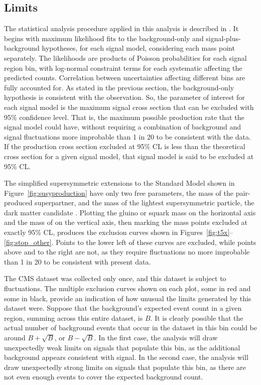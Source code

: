   \subsection{Limits} \label{sec:MT2limits}

  The \CL statistical analysis procedure applied in this analysis is described in \cite{CLS_method}.
  It begins with maximum likelihood fits to the background-only and signal-plus-background hypotheses, for each signal model, considering each mass point separately. 
  The likelihoods are products of Poisson probabilities for each signal region bin, with log-normal constraint terms for each systematic affecting the predicted counts.
  Correlation between uncertainties affecting different bins are fully accounted for.
  As stated in the previous section, the background-only hypothesis is consistent with the observation.
  So, the parameter of interest for each signal model is the maximum signal cross section that can be excluded with 95\% confidence level.
  That is, the maximum possible production rate that the signal model could have, without requiring a combination of background and signal fluctuations more improbable than 1 in 20 to be consistent with the data.
  If the production cross section excluded at 95\% CL is less than the theoretical cross section for a given signal model, that signal model is said to be excluded at 95\% CL.

  The simplified supersymmetric extensions to the Standard Model shown in Figure~\ref{fig:susyproduction} have only two free parameters, the mass of the pair-produced superpartner, and the mass of the lightest supersymmetric particle, the dark matter candidate \lsp.
  Plotting the gluino or squark mass on the horizontal axis and the mass of \lsp on the vertical axis, then marking the mass points excluded at exactly 95\% CL, produces the exclusion curves shown in Figures~\ref{fig:t5x}--\ref{fig:stop_other}.
  Points to the lower left of these curves are excluded, while points above and to the right are not, as they require fluctuations no more improbable than 1 in 20 to be consistent with present data.

  The CMS dataset was collected only once, and this dataset is subject to fluctuations.
  The multiple exclusion curves shown on each plot, some in red and some in black, provide an indication of how unusual the limits generated by this dataset were.
  Suppose that the background's expected event count in a given region, summing across this entire dataset, is $B$.
  It is clearly possible that the actual number of background events that occur in the dataset in this bin could be around $B+\sqrt{B}$, or $B-\sqrt{B}$.
  In the first case, the analysis will draw unexpectedly weak limits on signals that populate this bin, as the additional background appears consistent with signal.
  In the second case, the analysis will draw unexpectedly strong limits on signals that populate this bin, as there are not even enough events to cover the expected background count.

